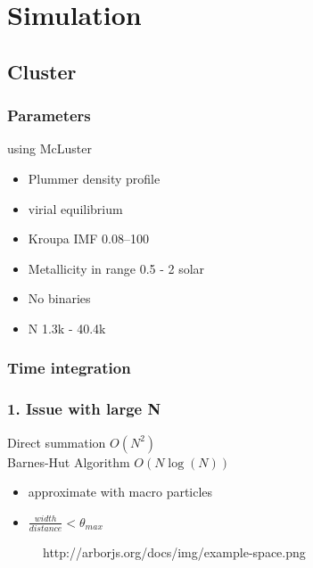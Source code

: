 \documentclass{beamer}
\begin{document}
\section{Simulation}

\subsection{Cluster}

\begin{frame}
\frametitle{Parameters}
using McLuster

\begin{itemize}
\item Plummer density profile
\item virial equilibrium
\item Kroupa IMF \SIrange{0.08}{100}{\solarmass}
\item Metallicity  in range 0.5 - 2 solar
\item No binaries
\item N 1.3k - 40.4k
\end{itemize}

\end{frame}

\subsubsection{Time integration}

\begin{frame}
\frametitle{1. Issue with large N}

Direct summation \(O(N^2)\)
\\[2ex]
Barnes-Hut Algorithm \(O(N\log(N))\)
\begin{itemize}
 \item approximate with macro particles
 \item \(\frac{width}{distance} < \theta_{max}\)
\end{itemize}

\end{frame}

\begin{frame}
\begin{figure}
\centering
{}
                  {http://arborjs.org/docs/img/example-space.png}
\end{figure}
\end{frame}
\end{document}
